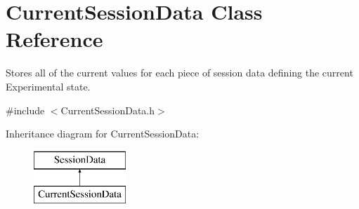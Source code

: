 \hypertarget{class_current_session_data}{\section{Current\-Session\-Data Class Reference}
\label{class_current_session_data}
}


Stores all of the current values for each piece of session data defining the current Experimental state.  




{\ttfamily \#include $<$Current\-Session\-Data.\-h$>$}

Inheritance diagram for Current\-Session\-Data\-:\begin{figure}[H]
\begin{center}
\leavevmode
\includegraphics[height=2.000000cm]{class_current_session_data}
\end{center}
\end{figure}
